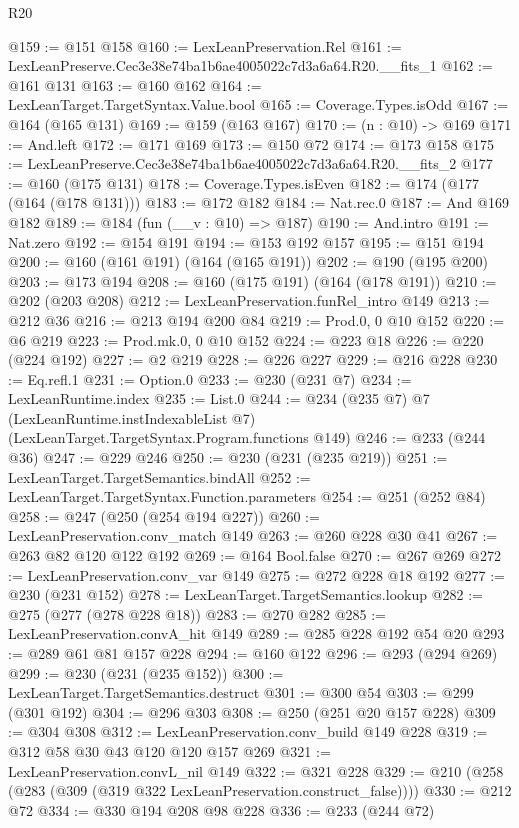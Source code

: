 \begin{lexlean}{R20}
\begin{coremodule}
@159 := @151 @158
@160 := LexLeanPreservation.Rel
@161 := LexLeanPreserve.Cec3e38e74ba1b6ae4005022c7d3a6a64.R20.__fits_1
@162 := @161 @131
@163 := @160 @162
@164 := LexLeanTarget.TargetSyntax.Value.bool
@165 := Coverage.Types.isOdd
@167 := @164 (@165 @131)
@169 := @159 (@163 @167)
@170 := (n : @10) -> @169
@171 := And.left
@172 := @171 @169
@173 := @150 @72
@174 := @173 @158
@175 := LexLeanPreserve.Cec3e38e74ba1b6ae4005022c7d3a6a64.R20.__fits_2
@177 := @160 (@175 @131)
@178 := Coverage.Types.isEven
@182 := @174 (@177 (@164 (@178 @131)))
@183 := @172 @182
@184 := Nat.rec.{0}
@187 := And @169 @182
@189 := @184 (fun (__v : @10) => @187)
@190 := And.intro
@191 := Nat.zero
@192 := @154 @191
@194 := @153 @192 @157
@195 := @151 @194
@200 := @160 (@161 @191) (@164 (@165 @191))
@202 := @190 (@195 @200)
@203 := @173 @194
@208 := @160 (@175 @191) (@164 (@178 @191))
@210 := @202 (@203 @208)
@212 := LexLeanPreservation.funRel_intro @149
@213 := @212 @36
@216 := @213 @194 @200 @84
@219 := Prod.{0, 0} @10 @152
@220 := @6 @219
@223 := Prod.mk.{0, 0} @10 @152
@224 := @223 @18
@226 := @220 (@224 @192)
@227 := @2 @219
@228 := @226 @227
@229 := @216 @228
@230 := Eq.refl.{1}
@231 := Option.{0}
@233 := @230 (@231 @7)
@234 := LexLeanRuntime.index
@235 := List.{0}
@244 := @234
    (@235 @7)
    @7
    (LexLeanRuntime.instIndexableList @7)
    (LexLeanTarget.TargetSyntax.Program.functions @149)
@246 := @233 (@244 @36)
@247 := @229 @246
@250 := @230 (@231 (@235 @219))
@251 := LexLeanTarget.TargetSemantics.bindAll
@252 := LexLeanTarget.TargetSyntax.Function.parameters
@254 := @251 (@252 @84)
@258 := @247 (@250 (@254 @194 @227))
@260 := LexLeanPreservation.conv_match @149
@263 := @260 @228 @30 @41
@267 := @263 @82 @120 @122 @192
@269 := @164 Bool.false
@270 := @267 @269
@272 := LexLeanPreservation.conv_var @149
@275 := @272 @228 @18 @192
@277 := @230 (@231 @152)
@278 := LexLeanTarget.TargetSemantics.lookup
@282 := @275 (@277 (@278 @228 @18))
@283 := @270 @282
@285 := LexLeanPreservation.convA_hit @149
@289 := @285 @228 @192 @54 @20
@293 := @289 @61 @81 @157 @228
@294 := @160 @122
@296 := @293 (@294 @269)
@299 := @230 (@231 (@235 @152))
@300 := LexLeanTarget.TargetSemantics.destruct
@301 := @300 @54
@303 := @299 (@301 @192)
@304 := @296 @303
@308 := @250 (@251 @20 @157 @228)
@309 := @304 @308
@312 := LexLeanPreservation.conv_build @149 @228
@319 := @312 @58 @30 @43 @120 @120 @157 @269
@321 := LexLeanPreservation.convL_nil @149
@322 := @321 @228
@329 := @210 (@258 (@283 (@309 (@319 @322 LexLeanPreservation.construct_false))))
@330 := @212 @72
@334 := @330 @194 @208 @98 @228
@336 := @233 (@244 @72)

\end{coremodule}
\end{lexlean}
